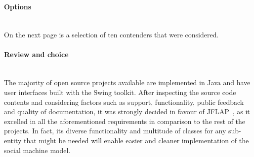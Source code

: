 \documentclass[12pt]{article}
\begin{document}
			\paragraph{Options}\hfill\\
				 On the next page is a selection of ten contenders that were considered.
			\paragraph{Review and choice}\hfill\\
				 The majority of open source projects available are implemented in Java and have user interfaces built with the Swing toolkit. After inspecting the source code contents and considering factors such as support, functionality, public feedback and quality of documentation, it was strongly decided in favour of JFLAP~\cite{rodger2006jflap}, as it excelled in all the aforementioned requirements in comparison to the rest of the projects. In fact, its diverse functionality and multitude of classes for any sub-entity that might be needed will enable easier and cleaner implementation of the social machine model.
\end{document}
